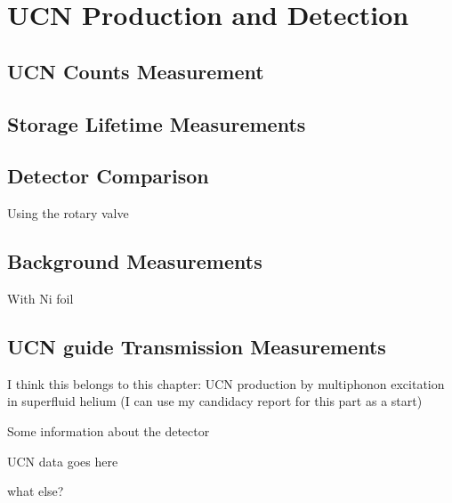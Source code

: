 \chapter{UCN Production and Detection}

\section{UCN Counts Measurement}

\section{Storage Lifetime Measurements}

\section{Detector Comparison}
Using the rotary valve

\section{Background Measurements}
With Ni foil

\section{UCN guide Transmission Measurements}


\begin{description}
\item{I think this belongs to this chapter: UCN production by
  multiphonon excitation in superfluid helium (I can use my candidacy
  report for this part as a start)}
  
\item{Some information about the detector}
  
\item{UCN data goes here}
  
\item{what else?}
\end{description}
